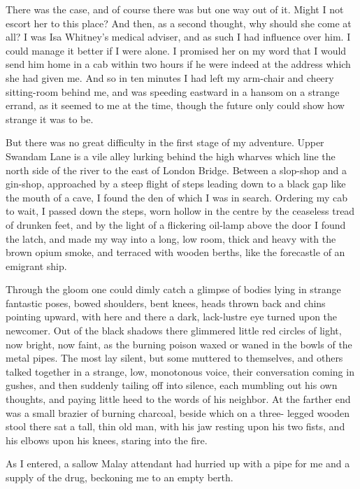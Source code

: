 There was the case, and of course there was but one way
out of it. Might I not escort her to this place? And then,
as a second thought, why should she come at all? I was Isa
Whitney’s medical adviser, and as such I had influence over
him. I could manage it better if I were alone. I promised
her on my word that I would send him home in a cab within
two hours if he were indeed at the address which she had
given me. And so in ten minutes I had left my arm-chair
and cheery sitting-room behind me, and was speeding eastward
in a hansom on a strange errand, as it seemed to me at
the time, though the future only could show how strange it
was to be.

But there was no great difficulty in the first stage of my
adventure. Upper Swandam Lane is a vile alley lurking behind
the high wharves which line the north side of the river
to the east of London Bridge. Between a slop-shop and a
gin-shop, approached by a steep flight of steps leading down
to a black gap like the mouth of a cave, I found the den of
which I was in search. Ordering my cab to wait, I passed
down the steps, worn hollow in the centre by the ceaseless
tread of drunken feet, and by the light of a flickering oil-lamp
above the door I found the latch, and made my way into a
long, low room, thick and heavy with the brown opium smoke,
and terraced with wooden berths, like the forecastle of an
emigrant ship.

Through the gloom one could dimly catch a glimpse of
bodies lying in strange fantastic poses, bowed shoulders, bent
knees, heads thrown back and chins pointing upward, with
here and there a dark, lack-lustre eye turned upon the newcomer.
Out of the black shadows there glimmered little red
circles of light, now bright, now faint, as the burning poison
waxed or waned in the bowls of the metal pipes. The most
lay silent, but some muttered to themselves, and others talked
together in a strange, low, monotonous voice, their conversation
coming in gushes, and then suddenly tailing off into silence,
each mumbling out his own thoughts, and paying little
heed to the words of his neighbor. At the farther end was a
small brazier of burning charcoal, beside which on a three-%
legged wooden stool there sat a tall, thin old man, with his
jaw resting upon his two fists, and his elbows upon his knees,
staring into the fire.

As I entered, a sallow Malay attendant had hurried up with
a pipe for me and a supply of the drug, beckoning me to an
empty berth.

